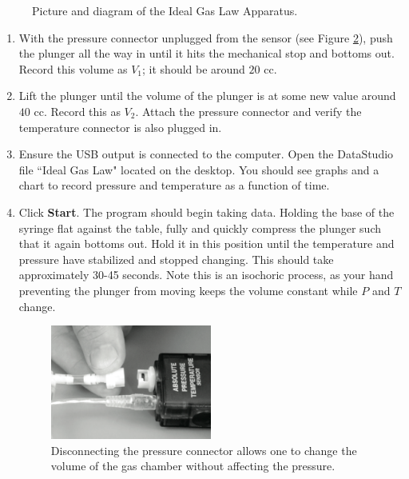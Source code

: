 \begin{figure}
\begin{subfigure}{0.48\textwidth}
\end{subfigure}
\caption{Picture and diagram of the Ideal Gas Law Apparatus.}
\label{idealapp}
\end{figure}

\begin{enumerate}
	\item With the pressure connector unplugged from the sensor (see Figure \ref{pdisc}), push the plunger all the way in until it hits the mechanical stop and bottoms out.  Record this volume as $V_{1}$; it should be around $20$ cc.
	\item Lift the plunger until the volume of the plunger is at some new value around $40$ cc.  Record this as $V_{2}$.  Attach the pressure connector and verify the temperature connector is also plugged in.
	\item Ensure the USB output is connected to the computer.  Open the DataStudio file ``Ideal Gas Law" located on the desktop.  You should see graphs and a chart to record pressure and temperature as a function of time.
	\item Click \textbf{Start}.  The program should begin taking data.  Holding the base of the syringe flat against the table, fully and quickly compress the plunger such that it again bottoms out.  Hold it in this position until the temperature and pressure have stabilized and stopped changing.  This should take approximately 30-45 seconds.  Note this is an isochoric process, as your hand preventing the plunger from moving keeps the volume constant while $P$ and $T$ change.
	\begin{figure}
		\centering
		\includegraphics[width=0.5\textwidth]{./Exp10/pic/pressuregaugepic}
		\caption{Disconnecting the pressure connector allows one to change the volume of the gas chamber without affecting the pressure.}
		\label{pdisc}
	\end{figure}


\end{enumerate}
